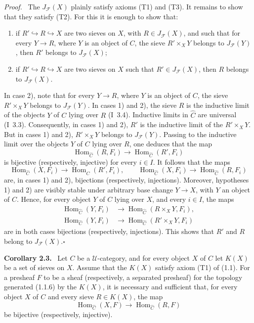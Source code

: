 \documentclass[11pt]{article}
\newcommand{\U}{\mathcal{U}}
\newcommand{\Hom}{\operatorname{Hom}}
\newcommand{\whC}{\widehat{C}}
\newcommand{\Fcal}{\mathcal{F}}
\newcommand{\qedtext}{\hfill\(\square\)}
\newenvironment{statement}[1]{\par\medskip\noindent\textbf{#1.}\ }{\par\medskip}
\newenvironment{prooftext}{\par\noindent\emph{Proof.}\ }{\par\medskip}
\begin{document}
\begin{prooftext}
The \(J_{\Fcal}(X)\) plainly satisfy axioms (T1) and (T3). It remains to show that they satisfy (T2). For this it is enough to show that:
\begin{enumerate}[label=\arabic*)]
\item if \(R'\hookrightarrow R\hookrightarrow X\) are two sieves on \(X\), with \(R\in J_{\Fcal}(X)\), and such that for every \(Y\to R\), where \(Y\) is an object of \(C\), the sieve \(R'\times_XY\) belongs to \(J_{\Fcal}(Y)\), then \(R'\) belongs to \(J_{\Fcal}(X)\);

\item if \(R'\hookrightarrow R\hookrightarrow X\) are two sieves on \(X\) such that \(R'\in J_{\Fcal}(X)\), then \(R\) belongs to \(J_{\Fcal}(X)\).
\end{enumerate}
\end{prooftext}

In case 2), note that for every \(Y\to R\), where \(Y\) is an object of \(C\), the sieve \(R'\times_XY\) belongs to \(J_{\Fcal}(Y)\). In cases 1) and 2), the sieve \(R\) is the inductive limit of the objects \(Y\) of \(C\) lying over \(R\) (I~3.4). Inductive limits in \(\whC\) are universal (I~3.3). Consequently, in cases 1) and 2), \(R'\) is the inductive limit of the \(R'\times_XY\). But in cases 1) and 2), \(R'\times_XY\) belongs to \(J_{\Fcal}(Y)\). Passing to the inductive limit over the objects \(Y\) of \(C\) lying over \(R\), one deduces that the map
\[
\Hom_{\whC}(R,F_i)\longrightarrow \Hom_{\whC}(R',F_i)
\]
is bijective (respectively, injective) for every \(i\in I\). It follows that the maps
\[
\Hom_{\whC}(X,F_i)\longrightarrow \Hom_{\whC}(R',F_i),
\qquad
\Hom_{\whC}(X,F_i)\longrightarrow \Hom_{\whC}(R,F_i)
\]
are, in cases 1) and 2), bijections (respectively, injections). Moreover, hypotheses 1) and 2) are visibly stable under arbitrary base change \(Y\to X\), with \(Y\) an object of \(C\). Hence, for every object \(Y\) of \(C\) lying over \(X\), and every \(i\in I\), the maps
\begin{align*}
\Hom_{\whC}(Y,F_i)&\longrightarrow \Hom_{\whC}(R\times_XY,F_i),\\
\Hom_{\whC}(Y,F_i)&\longrightarrow \Hom_{\whC}(R'\times_XY,F_i)
\end{align*}
are in both cases bijections (respectively, injections). This shows that \(R'\) and \(R\) belong to \(J_{\Fcal}(X)\).\qedtext

\begin{statement}{Corollary 2.3}
Let \(C\) be a \(\U\)-category, and for every object \(X\) of \(C\) let \(K(X)\) be a set of sieves on \(X\). Assume that the \(K(X)\) satisfy axiom (T1) of (1.1). For a presheaf \(F\) to be a sheaf (respectively, a separated presheaf) for the topology generated (1.1.6) by the \(K(X)\), it is necessary and sufficient that, for every object \(X\) of \(C\) and every sieve \(R\in K(X)\), the map
\[
\Hom_{\whC}(X,F)\longrightarrow \Hom_{\whC}(R,F)
\]
be bijective (respectively, injective).
\end{statement}
\end{document}
